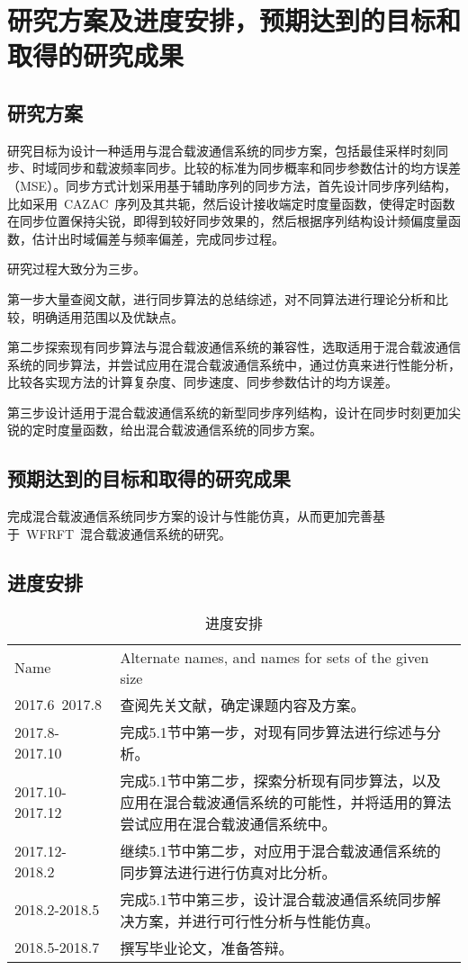 
\section{研究方案及进度安排，预期达到的目标和取得的研究成果}
\subsection{研究方案}
研究目标为设计一种适用与混合载波通信系统的同步方案，包括最佳采样时刻同步、时域同步和载波频率同步。比较的标准为同步概率和同步参数估计的均方误差（MSE）。同步方式计划采用基于辅助序列的同步方法，首先设计同步序列结构，比如采用~CAZAC~序列及其共轭，然后设计接收端定时度量函数，使得定时函数在同步位置保持尖锐，即得到较好同步效果的，然后根据序列结构设计频偏度量函数，估计出时域偏差与频率偏差，完成同步过程。

研究过程大致分为三步。

第一步大量查阅文献，进行同步算法的总结综述，对不同算法进行理论分析和比较，明确适用范围以及优缺点。

第二步探索现有同步算法与混合载波通信系统的兼容性，选取适用于混合载波通信系统的同步算法，并尝试应用在混合载波通信系统中，通过仿真来进行性能分析，比较各实现方法的计算复杂度、同步速度、同步参数估计的均方误差。

第三步设计适用于混合载波通信系统的新型同步序列结构，设计在同步时刻更加尖锐的定时度量函数，给出混合载波通信系统的同步方案。

\subsection{预期达到的目标和取得的研究成果}
完成混合载波通信系统同步方案的设计与性能仿真，从而更加完善基于~WFRFT~混合载波通信系统的研究。

\subsection{进度安排}
\begin{table}[htbp]
\centering
\caption{进度安排}\label{table3}\vspace{-0.5em}
\begin{tabularx}{0.8\textwidth}{lX}
\toprule
Name & Alternate names, and names for sets of the given size\\
2017.6~2017.8 & 查阅先关文献，确定课题内容及方案。\\
2017.8-2017.10 & 完成5.1节中第一步，对现有同步算法进行综述与分析。\\
2017.10-2017.12	& 完成5.1节中第二步，探索分析现有同步算法，以及应用在混合载波通信系统的可能性，并将适用的算法尝试应用在混合载波通信系统中。\\
2017.12-2018.2 & 继续5.1节中第二步，对应用于混合载波通信系统的同步算法进行进行仿真对比分析。\\
2018.2-2018.5 & 完成5.1节中第三步，设计混合载波通信系统同步解决方案，并进行可行性分析与性能仿真。\\
2018.5-2018.7 & 撰写毕业论文，准备答辩。\\
\bottomrule
\end{tabularx}
\end{table}


